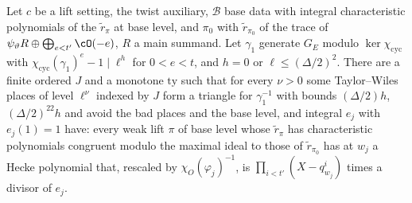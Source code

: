 \begin{proposition}\label{cg-first:prop:places}
Let $c$ be a lift setting, the twist auxiliary, $\mathcal B$ base data with integral characteristic
polynomials of the $\tilde r_\pi$ at base level, and $\pi_0$ with $\tilde r_{\pi_0}$ of the trace of $\psi_\vartheta R\oplus
\bigoplus_{e<t'}\cO(-e)$, $R$ a main summand. Let $\gamma_1$ generate $G_E$
modulo $\ker\chi_{\mathrm{cyc}}$ with $\chi_{\mathrm{cyc}}(\gamma_1)^e-1\mid\ell^h$ for $0<e<t$, and
$h=0$ or $\ell\le(\Delta/2)^2$. There are a finite ordered $J$ and a monotone $\mathrm{ty}$ such that for
every $\nu>0$ some Taylor--Wiles places of level $\ell^\nu$ indexed by $J$ form a triangle for
$\gamma_1^{-1}$ with bounds $(\Delta/2)h$, $(\Delta/2)^{22}h$ and avoid the bad places and the base
level, and integral $e_j$ with $e_j(1)=1$ have: every weak lift $\pi$ of base level whose $\tilde r_\pi$ has
characteristic polynomials congruent modulo the maximal ideal to those of $\tilde r_{\pi_0}$ has at $w_j$ a Hecke
polynomial that, rescaled by $\chi_O(\varphi_j)^{-1}$, is $\prod_{i<t'}(X-q_{w_j}^i)$ times a divisor
of $e_j$. 
\end{proposition}

